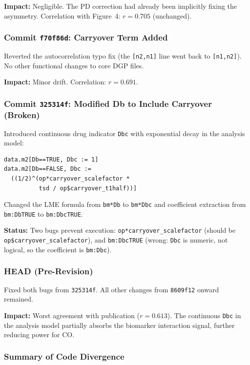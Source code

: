 \documentclass[11pt]{article}
\begin{document}
\textbf{Impact:} Negligible. The PD correction had already
been implicitly fixing the asymmetry. Correlation with
Figure~4: $r = 0.705$ (unchanged).

\subsubsection{Commit \texttt{f70f86d}: Carryover Term Added}

Reverted the autocorrelation typo fix (the
\texttt{[n2,n1]} line went back to \texttt{[n1,n2]}).
No other functional changes to core DGP files.

\textbf{Impact:} Minor drift. Correlation: $r = 0.691$.

\subsubsection{Commit \texttt{325314f}: Modified Db to
              Include Carryover (Broken)}

Introduced continuous drug indicator \texttt{Dbc} with
exponential decay in the analysis model:

\begin{verbatim}
data.m2[Db==TRUE, Dbc := 1]
data.m2[Db==FALSE, Dbc :=
  ((1/2)^(op*carryover_scalefactor *
          tsd / op$carryover_t1half))]
\end{verbatim}

Changed the LME formula from \texttt{bm*Db} to
\texttt{bm*Dbc} and coefficient extraction from
\texttt{bm:DbTRUE} to \texttt{bm:DbcTRUE}.

\textbf{Status:} Two bugs prevent execution:
\texttt{op*carryover\_scalefactor} (should be
\texttt{op\$carryover\_scalefactor}), and
\texttt{bm:DbcTRUE} (wrong: \texttt{Dbc} is numeric,
not logical, so the coefficient is \texttt{bm:Dbc}).

\subsubsection{HEAD (Pre-Revision)}

Fixed both bugs from \texttt{325314f}. All other changes
from \texttt{8609f12} onward remained.

\textbf{Impact:} Worst agreement with publication
($r = 0.613$). The continuous \texttt{Dbc} in the
analysis model partially absorbs the biomarker
interaction signal, further reducing power for CO.

\subsubsection{Summary of Code Divergence}
\end{document}
